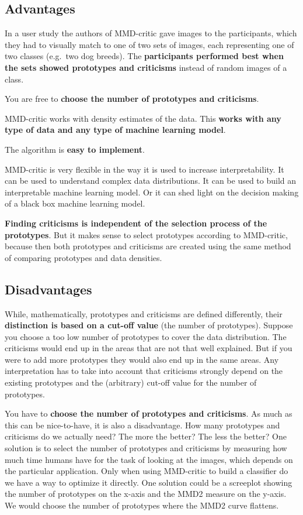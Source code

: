 \documentclass[
  10pt,
]{scrbook}
\begin{document}
\hypertarget{advantages-11}{%
\subsection{Advantages}\label{advantages-11}}

In a user study the authors of MMD-critic gave images to the participants, which they had to visually match to one of two sets of images, each representing one of two classes (e.g.~two dog breeds).
The \textbf{participants performed best when the sets showed prototypes and criticisms} instead of random images of a class.

You are free to \textbf{choose the number of prototypes and criticisms}.

MMD-critic works with density estimates of the data.
This \textbf{works with any type of data and any type of machine learning model}.

The algorithm is \textbf{easy to implement}.

MMD-critic is very flexible in the way it is used to increase interpretability.
It can be used to understand complex data distributions.
It can be used to build an interpretable machine learning model.
Or it can shed light on the decision making of a black box machine learning model.

\textbf{Finding criticisms is independent of the selection process of the prototypes}.
But it makes sense to select prototypes according to MMD-critic, because then both prototypes and criticisms are created using the same method of comparing prototypes and data densities.

\hypertarget{disadvantages-11}{%
\subsection{Disadvantages}\label{disadvantages-11}}

While, mathematically, prototypes and criticisms are defined differently, their \textbf{distinction is based on a cut-off value} (the number of prototypes).
Suppose you choose a too low number of prototypes to cover the data distribution.
The criticisms would end up in the areas that are not that well explained.
But if you were to add more prototypes they would also end up in the same areas.
Any interpretation has to take into account that criticisms strongly depend on the existing prototypes and the (arbitrary) cut-off value for the number of prototypes.

You have to \textbf{choose the number of prototypes and criticisms}.
As much as this can be nice-to-have, it is also a disadvantage.
How many prototypes and criticisms do we actually need?
The more the better? The less the better?
One solution is to select the number of prototypes and criticisms by measuring how much time humans have for the task of looking at the images, which depends on the particular application.
Only when using MMD-critic to build a classifier do we have a way to optimize it directly.
One solution could be a screeplot showing the number of prototypes on the x-axis and the MMD2 measure on the y-axis.
We would choose the number of prototypes where the MMD2 curve flattens.
\end{document}

